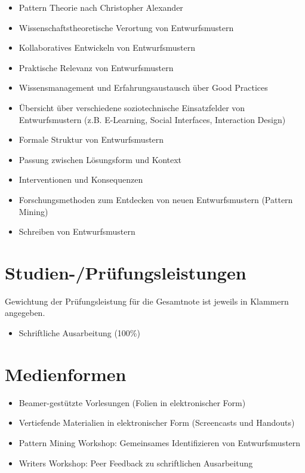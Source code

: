 \begin{itemize}
\tightlist
\item
  Pattern Theorie nach Christopher Alexander
\item
  Wissenschaftstheoretische Verortung von Entwurfsmustern
\item
  Kollaboratives Entwickeln von Entwurfsmustern
\item
  Praktische Relevanz von Entwurfsmustern
\item
  Wissensmanagement und Erfahrungsaustausch über Good Practices
\item
  Übersicht über verschiedene soziotechnische Einsatzfelder von
  Entwurfsmustern (z.B. E-Learning, Social Interfaces, Interaction
  Design)
\item
  Formale Struktur von Entwurfsmustern
\item
  Passung zwischen Lösungsform und Kontext
\item
  Interventionen und Konsequenzen
\item
  Forschungsmethoden zum Entdecken von neuen Entwurfsmustern (Pattern
  Mining)
\item
  Schreiben von Entwurfsmustern
\end{itemize}

\section*{Studien-/Prüfungsleistungen\label{/mi-2017/modulbeschreibungen-master/MA_SC_Soziotechnische_Entwurfsmuster}}\label{studien-pruxfcfungsleistungenpathlabelmi-2017modulbeschreibungen-mastermaux5fscux5fsoziotechnischeux5fentwurfsmuster}

Gewichtung der Prüfungsleistung für die Gesamtnote ist jeweils in
Klammern angegeben.

\begin{itemize}
\tightlist
\item
  Schriftliche Ausarbeitung (100\%)
\end{itemize}

\section*{Medienformen\label{/mi-2017/modulbeschreibungen-master/MA_SC_Soziotechnische_Entwurfsmuster}}\label{medienformenpathlabelmi-2017modulbeschreibungen-mastermaux5fscux5fsoziotechnischeux5fentwurfsmuster}

\begin{itemize}
\tightlist
\item
  Beamer-gestützte Vorlesungen (Folien in elektronischer Form)
\item
  Vertiefende Materialien in elektronischer Form (Screencasts und
  Handouts)
\item
  Pattern Mining Workshop: Gemeinsames Identifizieren von
  Entwurfsmustern
\item
  Writers Workshop: Peer Feedback zu schriftlichen Ausarbeitung
\end{itemize}

